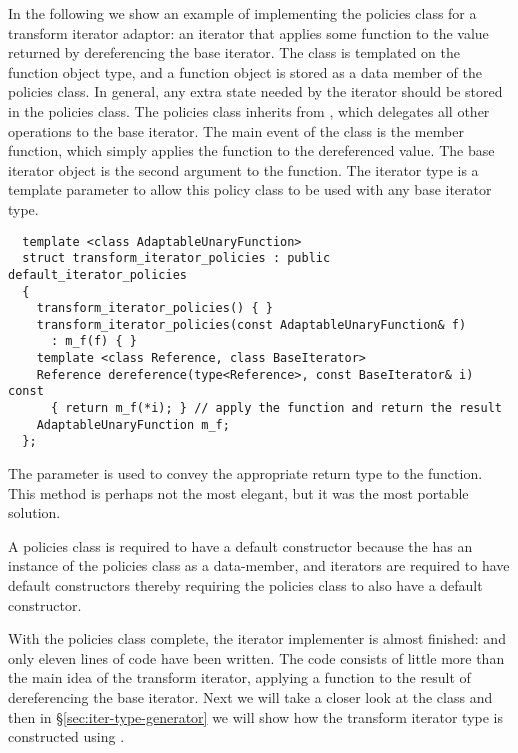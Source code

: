 \documentclass{netobjectdays}
\begin{document}
In the following we show an example of implementing the policies class
for a transform iterator adaptor: an iterator that applies some
function to the value returned by dereferencing the base iterator.
The  class is templated on the
function object type, and a function object is stored as a data member
of the policies class.  In general, any extra state needed by the
iterator should be stored in the policies class. The policies class
inherits from , which delegates
all other operations to the base iterator. The main event of the
 class is the
 member function, which simply applies the
function to the dereferenced value. The base iterator object is the
second argument to the  function. The iterator
type is a template parameter to allow this policy class to be used
with any base iterator type.

{\footnotesize
\begin{verbatim}
  template <class AdaptableUnaryFunction>
  struct transform_iterator_policies : public default_iterator_policies
  {
    transform_iterator_policies() { }
    transform_iterator_policies(const AdaptableUnaryFunction& f)
      : m_f(f) { }
    template <class Reference, class BaseIterator>
    Reference dereference(type<Reference>, const BaseIterator& i) const
      { return m_f(*i); } // apply the function and return the result
    AdaptableUnaryFunction m_f;
  };
\end{verbatim}
}

The  parameter is used to convey the appropriate
return type to the  function. This method is
perhaps not the most elegant, but it was the most portable solution.

A policies class is required to have a default constructor because the
 has an instance of the policies class as a
data-member, and iterators are required to have default constructors
thereby requiring the policies class to also have a default
constructor.

With the policies class complete, the iterator implementer is almost
finished: and only eleven lines of code have been written. The code
consists of little more than the main idea of the transform iterator,
applying a function to the result of dereferencing the base iterator.
Next we will take a closer look at the
 class and then in
\S\ref{sec:iter-type-generator} we will show how the transform
iterator type is constructed using .
\end{document}
